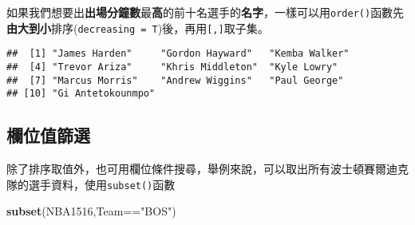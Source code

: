 \documentclass[]{book}
\newenvironment{Shaded}{\begin{snugshade}}{\end{snugshade}}
\newcommand{\KeywordTok}[1]{\textcolor[rgb]{0.13,0.29,0.53}{\textbf{{#1}}}}
\newcommand{\DataTypeTok}[1]{\textcolor[rgb]{0.13,0.29,0.53}{{#1}}}
\newcommand{\DecValTok}[1]{\textcolor[rgb]{0.00,0.00,0.81}{{#1}}}
\newcommand{\StringTok}[1]{\textcolor[rgb]{0.31,0.60,0.02}{{#1}}}
\newcommand{\NormalTok}[1]{{#1}}
\begin{document}
如果我們想要出\textbf{出場分鐘數}最\textbf{高}的前十名選手的\textbf{名字}，一樣可以用\texttt{order()}函數先\textbf{由大到小}排序(\texttt{decreasing\ =\ T})後，再用\texttt{{[},{]}}取子集。

\begin{Shaded}
\end{Shaded}

\begin{verbatim}
##  [1] "James Harden"     "Gordon Hayward"   "Kemba Walker"    
##  [4] "Trevor Ariza"     "Khris Middleton"  "Kyle Lowry"      
##  [7] "Marcus Morris"    "Andrew Wiggins"   "Paul George"     
## [10] "Gi Antetokounmpo"
\end{verbatim}

\subsection{欄位值篩選}

除了排序取值外，也可用欄位條件搜尋，舉例來說，可以取出所有波士頓賽爾迪克隊的選手資料，使用\texttt{subset()}函數

\begin{Shaded}
\begin{Highlighting}[]
\KeywordTok{subset}\NormalTok{(NBA1516,Team==}\StringTok{"BOS"}\NormalTok{)}
\end{Highlighting}
\end{Shaded}
\end{document}
